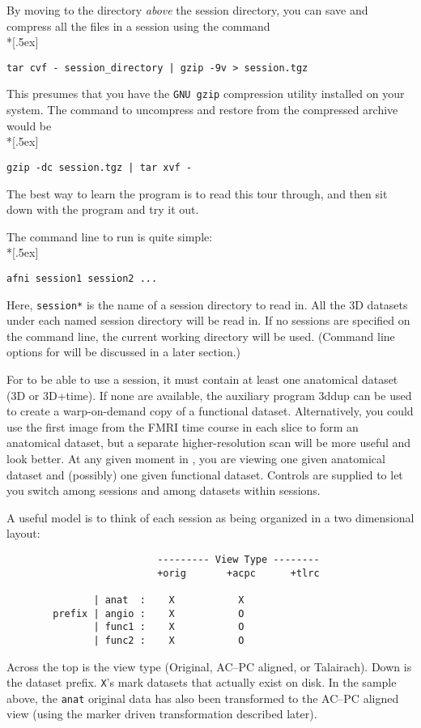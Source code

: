 By moving to the directory {\it above\/} the session directory,
you can save and compress all the files in a session using the command\\*[.5ex]
\centerline{\tt tar cvf - session\_directory | gzip -9v > session.tgz}\vspace{0.5ex}
This presumes that you have the {\tt GNU gzip} compression utility installed
on your system.  The command to uncompress and restore from the compressed
archive would be\\*[.5ex]
\centerline{\tt gzip -dc session.tgz | tar xvf -}

\newpage
{}
The best way to learn the program is to
read this tour through, and then sit down with the program
and try it out.

The command line to run \afnit is quite simple:\\*[.5ex]
\centerline{\tt afni session1 session2 ...}\vspace{0.5ex}
Here, {\tt session*} is the name of a session directory to
read in.  All the 3D datasets under each named session directory
will be read in.  If no sessions are specified on the command line,
the current working directory will be used.
(Command line options for \afnit will be discussed in a later section.)

For \afnit to be able to use a session, it must
contain at least one anatomical dataset (3D or 3D+time).  If none are
available, the auxiliary program {\sf 3ddup} can be
used to create a warp-on-demand copy of a functional dataset.
Alternatively, you could use
the first image from the FMRI time course in each slice to form
an anatomical dataset, but a separate higher-resolution scan will
be more useful and look better.
At any given moment in \afni,
you are viewing one given anatomical dataset and (possibly) one given
functional dataset.  Controls are supplied to let you switch among
sessions and among datasets within sessions.

\goodbreak

A useful model is to think of each session as being organized in a
two dimensional layout:
\goodbreak\begin{samepage}\begin{verbatim}
                          --------- View Type --------
                          +orig       +acpc      +tlrc

               | anat  :    X           X
        prefix | angio :    X           O
               | func1 :    X           O
               | func2 :    X           O
\end{verbatim}\end{samepage}
Across the top is the view type (Original, AC--PC aligned, or Talairach).
Down is the dataset prefix.  {\tt X}'s mark datasets that
actually exist on disk.  In the sample above, the {\tt anat}
original data has also been transformed to the AC--PC aligned
view (using the marker driven transformation described later).

